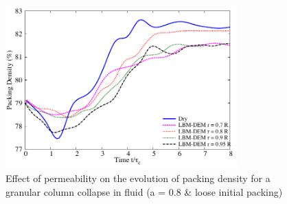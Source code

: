 \begin{figure}
	\centering
    \includegraphics[width=0.8\textwidth]{Packing_Density_a08_loose}
    \caption{Effect of permeability on the evolution of packing density for a 
    granular column collapse in fluid (a = 0.8 \& loose initial packing)}
    \label{fig:Packing_Density_a08_loose}
\end{figure}

